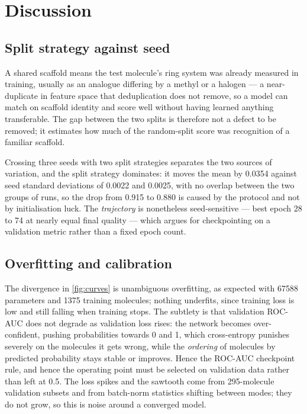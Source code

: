 \section{Discussion}
\label{sec:discussion}

\subsection{Split strategy against seed}

A shared scaffold means the test molecule's ring system was already measured in training, usually as an analogue differing by a methyl or a halogen --- a near-duplicate in feature space that deduplication does not remove, so a model can match on scaffold identity and score well without having learned anything transferable. The gap between the two splits is therefore not a defect to be removed; it estimates how much of the random-split score was recognition of a familiar scaffold.

Crossing three seeds with two split strategies separates the two sources of variation, and the split strategy dominates: it moves the mean by 0.0354 against seed standard deviations of 0.0022 and 0.0025, with no overlap between the two groups of runs, so the drop from 0.915 to 0.880 is caused by the protocol and not by initialisation luck. The \emph{trajectory} is nonetheless seed-sensitive --- best epoch 28 to 74 at nearly equal final quality --- which argues for checkpointing on a validation metric rather than a fixed epoch count.

\subsection{Overfitting and calibration}

The divergence in \cref{fig:curves} is unambiguous overfitting, as expected with \num{67588} parameters and 1375 training molecules; nothing underfits, since training loss is low and still falling when training stops. The subtlety is that validation ROC-AUC does not degrade as validation loss rises: the network becomes over-confident, pushing probabilities towards 0 and 1, which cross-entropy punishes severely on the molecules it gets wrong, while the \emph{ordering} of molecules by predicted probability stays stable or improves. Hence the ROC-AUC checkpoint rule, and hence the operating point must be selected on validation data rather than left at 0.5. The loss spikes and the sawtooth come from 295-molecule validation subsets and from batch-norm statistics shifting between modes; they do not grow, so this is noise around a converged model.

